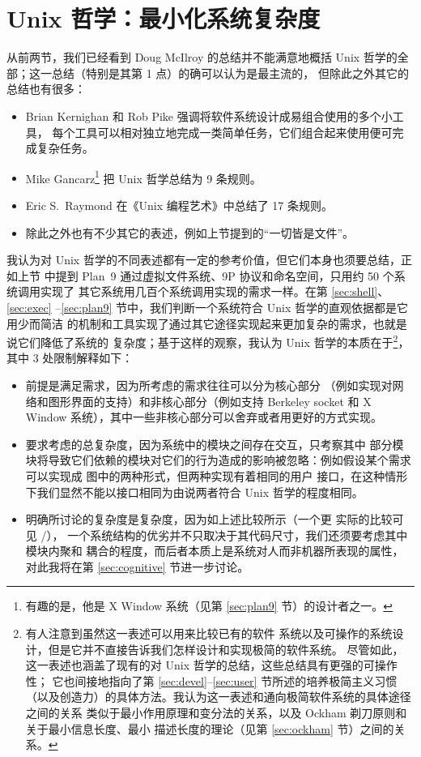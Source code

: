 \section{Unix 哲学：最小化系统复杂度}\label{sec:complex}

从前两节，我们已经看到 Doug McIlroy 的总结并不能满意地概括 Unix
哲学的全部；这一总结（特别是其第 1 点）的确可以认为是最主流的，
但除此之外其它的总结也有很多：
\begin{itemize}
\item Brian Kernighan 和 Rob Pike 强调将软件系统设计成易组合使用的多个小工具，
	每个工具可以相对独立地完成一类简单任务，它们组合起来使用便可完成复杂任务。
\item Mike Gancarz\footnote{有趣的是，他是 X Window 系统（见第
	\ref{sec:plan9} 节）的设计者之一。} 把 Unix 哲学总结为 9 条规则。
\item Eric S.\ Raymond 在《Unix 编程艺术》中总结了 17 条规则。
\item 除此之外也有不少其它的表述，例如上节提到的“一切皆是文件”。
\end{itemize}
我认为对 Unix 哲学的不同表述都有一定的参考价值，但它们本身也须要总结，正如上节
中提到 Plan~9 通过虚拟文件系统、9P 协议和命名空间，只用约 50 个系统调用实现了
其它系统用几百个系统调用实现的需求一样。在第 \ref{sec:shell}、\ref{sec:exec}%
--\ref{sec:plan9} 节中，我们判断一个系统符合 Unix 哲学的直观依据都是它用少而简洁
的机制和工具实现了通过其它途径实现起来更加复杂的需求，也就是说它们降低了系统的
复杂度；基于这样的观察，我认为 Unix 哲学的本质在于\footnote{有人注意到虽然这一表述可以用来比较已有的软件
系统以及可操作的系统设计，但是它并不直接告诉我们怎样设计和实现极简的软件系统。
尽管如此，这一表述也涵盖了现有的对 Unix 哲学的总结，这些总结具有更强的可操作性；
它也间接地指向了第 \ref{sec:devel}--\ref{sec:user} 节所述的培养极简主义习惯
（以及创造力）的具体方法。我认为这一表述和通向极简软件系统的具体途径之间的关系
类似于最小作用原理和变分法的关系，以及 Ockham 剃刀原则和关于最小信息长度、最小
描述长度的理论（见第 \ref{sec:ockham} 节）之间的关系。}，其中 3 处限制解释如下：
\begin{itemize}
\item 前提是满足需求，因为所考虑的需求往往可以分为核心部分
	（例如实现对网络和图形界面的支持）和非核心部分（例如支持 Berkeley socket
	和 X Window 系统），其中一些非核心部分可以舍弃或者用更好的方式实现。
\item 要求考虑的总复杂度，因为系统中的模块之间存在交互，只考察其中
	部分模块将导致它们依赖的模块对它们的行为造成的影响被忽略：例如假设某个需求
	可以实现成 \parencite{litt2014a} 图中的两种形式，但两种实现有着相同的用户
	接口，在这种情形下我们显然不能以接口相同为由说两者符合 Unix 哲学的程度相同。
\item 明确所讨论的复杂度是复杂度，因为如上述比较所示（一个更
	实际的比较可见 \parencite{github:acmetiny}/\parencite{gitea:emca}），
	一个系统结构的优劣并不只取决于其代码尺寸，我们还须要考虑其中模块内聚和
	耦合的程度，而后者本质上是系统对人而非机器所表现的属性，对此我将在第
	\ref{sec:cognitive} 节进一步讨论。
\end{itemize}

